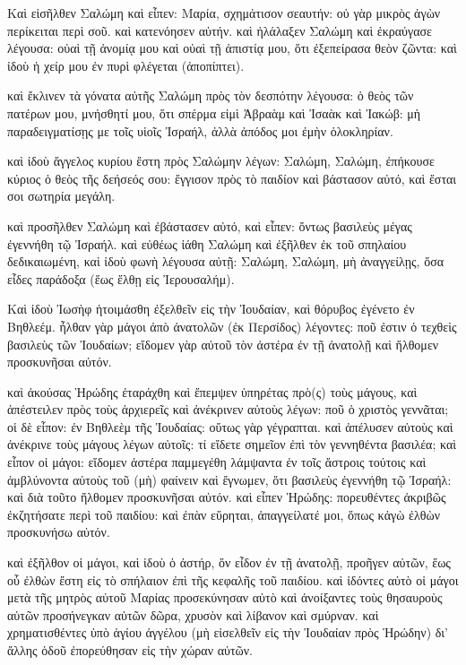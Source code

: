 \pend\pstart
{}

\pend\setcounter{pstartL}{1}\pstart
Καὶ εἰσῆλθεν Σαλώμη καὶ εἶπεν: Μαρία, σχημάτισον σεαυτήν: οὐ γὰρ μικρὸς ἀγὼν περίκειται περὶ σοῦ. καὶ κατενόησεν αὐτήν. καὶ ἠλάλαξεν Σαλώμη καὶ ἐκραύγασε λέγουσα: οὐαὶ τῇ ἀνομίᾳ μου καὶ οὐαὶ τῇ ἀπιστίᾳ μου, ὅτι ἐξεπείρασα θεὸν ζῶντα: καὶ ἰδοὺ ἡ χείρ μου ἐν πυρὶ φλέγεται (ἀποπίπτει).

\pend\pstart
καὶ ἔκλινεν τὰ γόνατα αὐτῆς Σαλώμη πρὸς τὸν δεσπότην λέγουσα: ὁ θεὸς τῶν πατέρων μου, μνήσθητί μου, ὅτι σπέρμα εἰμὶ Ἀβραὰμ καὶ Ἰσαὰκ καὶ Ἰακώβ: μὴ παραδειγματίσῃς με τοῖς υἱοῖς Ἰσραήλ, ἀλλὰ ἀπόδος μοι ἐμὴν ὁλοκληρίαν.

\pend\pstart
καὶ ἰδοὺ ἄγγελος κυρίου ἔστη πρὸς Σαλώμην λέγων: Σαλώμη, Σαλώμη, ἐπήκουσε κύριος ὁ θεὸς τῆς δεήσεός σου: ἔγγισον πρὸς τὸ παιδίον καὶ βάστασον αὐτό, καὶ ἔσται σοι σωτηρία μεγάλη.

\pend\pstart
καὶ προσῆλθεν Σαλώμη καὶ ἐβάστασεν αὐτό, καὶ εἶπεν: ὄντως βασιλεὺς μέγας ἐγεννήθη τῷ Ἰσραήλ. καὶ εὐθέως ἰάθη Σαλώμη καὶ ἐξῆλθεν ἐκ τοῦ σπηλαίου δεδικαιωμένη, καὶ ἰδοὺ φωνὴ λέγουσα αὐτῇ: Σαλώμη, Σαλώμη, μὴ ἀναγγείλῃς, ὅσα εἶδες παράδοξα (ἕως ἔλθῃ εἰς Ἰερουσαλήμ).

\pend\pstart
{}

\pend\setcounter{pstartL}{1}\pstart
Καὶ ἰδοὺ Ἰωσὴφ ἡτοιμάσθη ἐξελθεῖν εἰς τὴν Ἰουδαίαν, καὶ θόρυβος ἐγένετο ἐν Βηθλεέμ. ἦλθαν γὰρ μάγοι ἀπὸ ἀνατολῶν (ἐκ Περσίδος) λέγοντες: ποῦ ἐστιν ὁ τεχθεὶς βασιλεὺς τῶν Ἰουδαίων; εἴδομεν γὰρ αὐτοῦ τὸν ἀστέρα ἐν τῇ ἀνατολῇ καὶ ἤλθομεν προσκυνῆσαι αὐτόν.

\pend\pstart
καὶ ἀκούσας Ἡρώδης ἐταράχθη καὶ ἔπεμψεν ὑπηρέτας πρὸ(ς) τοὺς μάγους, καὶ ἀπέστειλεν πρὸς τοὺς ἀρχιερεῖς καὶ ἀνέκρινεν αὐτοὺς λέγων: ποῦ ὁ χριστὸς γεννᾶται; οἱ δὲ εἶπον: ἐν Βηθλεὲμ τῆς Ἰουδαίας: οὕτως γὰρ γέγραπται. καὶ ἀπέλυσεν αὐτοὺς καὶ ἀνέκρινε τοὺς μάγους λέγων αὐτοῖς: τί εἴδετε σημεῖον ἐπὶ τὸν γεννηθέντα βασιλέα; καὶ εἶπον οἱ μάγοι: εἴδομεν ἀστέρα παμμεγέθη λάμψαντα ἐν τοῖς ἄστροις τούτοις καὶ ἀμβλύνοντα αὐτοὺς τοῦ (μὴ) φαίνειν καὶ ἔγνωμεν, ὅτι βασιλεὺς ἐγεννήθη τῷ Ἰσραήλ: καὶ διὰ τοῦτο ἤλθομεν προσκυνῆσαι αὐτόν. καὶ εἶπεν Ἡρώδης: πορευθέντες ἀκριβῶς ἐκζητήσατε περὶ τοῦ παιδίου: καὶ ἐπὰν εὕρηται, ἀπαγγείλατέ μοι, ὅπως κἀγὼ ἐλθὼν προσκυνήσω αὐτόν.

\pend\pstart
καὶ ἐξῆλθον οἱ μάγοι, καὶ ἰδοὺ ὁ ἀστήρ, ὅν εἶδον ἐν τῇ ἀνατολῇ, προῆγεν αὐτῶν, ἕως οὗ ἐλθὼν ἔστη εἰς τὸ σπήλαιον ἐπὶ τῆς κεφαλῆς τοῦ παιδίου. καὶ ἰδόντες αὐτὸ οἱ μάγοι μετὰ τῆς μητρὸς αὐτοῦ Μαρίας προσεκύνησαν αὐτὸ καὶ ἀνοίξαντες τοὺς θησαυροὺς αὐτῶν προσήνεγκαν αὐτῶν δῶρα, χρυσὸν καὶ λίβανον καὶ σμύρναν. καὶ χρηματισθέντες ὑπὸ ἁγίου ἀγγέλου (μὴ εἰσελθεῖν εἰς τὴν Ἰουδαίαν πρὸς Ἡρώδην) δι' ἄλλης ὁδοῦ ἐπορεύθησαν εἰς τὴν χώραν αὐτῶν.

